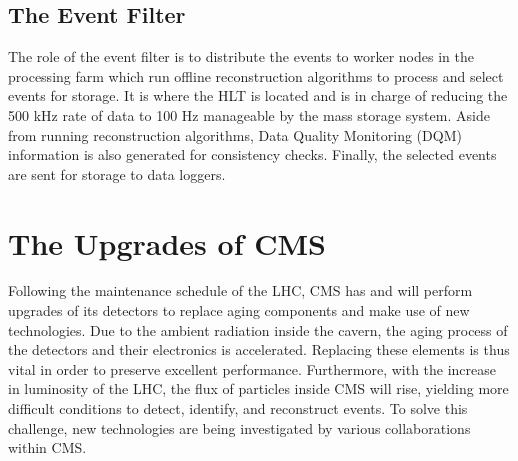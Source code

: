     \subsection{The Event Filter}

      The role of the event filter is to distribute the events to worker nodes in the processing farm which run offline reconstruction algorithms to process and select events for storage. It is where the HLT is located and is in charge of reducing the 500 kHz rate of data to 100 Hz manageable by the mass storage system. Aside from running reconstruction algorithms, Data Quality Monitoring (DQM) information is also generated for consistency checks. Finally, the selected events are sent for storage to data loggers.

  \section{The Upgrades of CMS}

    Following the maintenance schedule of the LHC, CMS has and will perform upgrades of its detectors to replace aging components and make use of new technologies. Due to the ambient radiation inside the cavern, the aging process of the detectors and their electronics is accelerated. Replacing these elements is thus vital in order to preserve excellent performance. Furthermore, with the increase in luminosity of the LHC, the flux of particles inside CMS will rise, yielding more difficult conditions to detect, identify, and reconstruct events. To solve this challenge, new technologies are being investigated by various collaborations within CMS.
